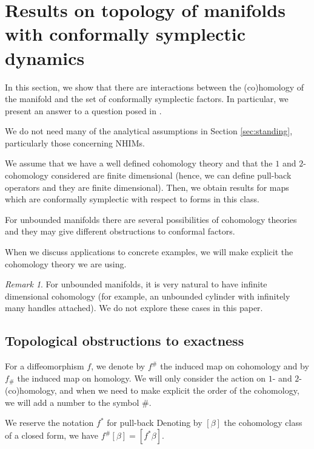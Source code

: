 \documentclass[11pt]{amsart}
\theoremstyle{definition}
\theoremstyle{remark}
\newtheorem{rem}[thm]{Remark}
\numberwithin{equation}{section}
\begin{document}
\section{Results on topology of manifolds with conformally symplectic dynamics}
\label{sec:topological}

In this section, we show that there are interactions between the
(co)homology of the manifold  and the set of conformally symplectic
factors. In particular, we  present an answer to a question
posed in \cite[p. 160]{ArnaudF24}.

We do not need  many of the analytical assumptions in Section \ref{sec:standing}, particularly those concerning NHIMs.

We assume  that we have  a well defined cohomology theory
and that the $1$ and $2$-cohomology considered are finite dimensional (hence,
we can define pull-back operators and they are finite dimensional).
Then, we  obtain results for maps which are conformally symplectic with respect to  forms in this class.

For unbounded manifolds
there are several possibilities of cohomology theories and they  may give different
obstructions to conformal factors.

When we discuss applications to concrete examples, we will make explicit
the cohomology theory we are using.

\begin{rem}
  For unbounded manifolds, it is very natural to have infinite dimensional cohomology
  (for example, an unbounded cylinder with infinitely many handles attached).
We do not explore these cases in this paper.
\end{rem}



\subsection{Topological obstructions to exactness}
\label{sec:exactness}
For a diffeomorphism $f$, we denote by $f^\# $ the induced map  on
cohomology and by $f_\#$ the induced map on homology.
We will only  consider the action on $1$- and  $2$-(co)homology, and when  we need to
make explicit the order of the cohomology, we will add a number  to the symbol $\#$.



We reserve the notation $f^*$
for pull-back
Denoting by $[ \beta]$
the cohomology class of a closed form,
we have $f^\#[\beta] = [f^* \beta]$.
\end{document}
